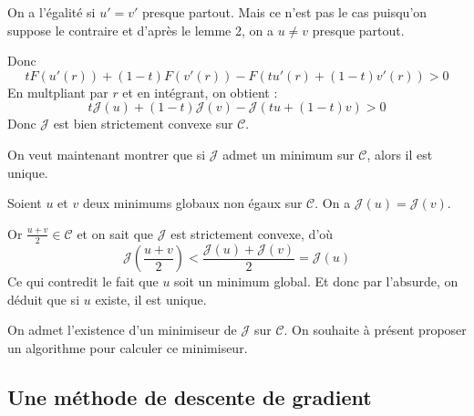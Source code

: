 \documentclass{article}
\newcommand{\SetC}{\mathcal{C}}
\newcommand{\FunctionJ}{\mathcal{J}}
\begin{document}
{    On a l'égalité si $u' = v'$ presque partout. Mais ce n'est pas le cas puisqu'on suppose le contraire et d'après le lemme 2, on a $u \neq v$ presque partout.

    Donc $$t F(u'(r)) + (1-t) F(v'(r)) - F(t u'(r) + (1-t) v'(r)) > 0$$
    En multpliant par $r$ et en intégrant, on obtient :
    $$t \FunctionJ(u) + (1-t) \FunctionJ(v) - \FunctionJ(t u + (1 - t) v) > 0$$
    Donc $\FunctionJ$ est bien strictement convexe sur $\SetC$.\newline

    On veut maintenant montrer que si $\FunctionJ$ admet un minimum sur $\SetC$, alors il est unique.

    Soient $u$ et $v$ deux minimums globaux non égaux sur $\SetC$.
    On a $\mathcal{J}(u) = \mathcal{J}(v)$.

    Or $\frac{u+v}{2}\in \SetC$ et on sait que $\FunctionJ$ est strictement convexe, d'où $$\FunctionJ \left( \frac{u+v}{2} \right) < \frac{\FunctionJ(u)+\FunctionJ(v)}{2} = \FunctionJ(u)$$
    Ce qui contredit le fait que $u$ soit un minimum global. Et donc par l'absurde, on déduit que si $u$ existe, il est unique.\newline

    
}


On admet l’existence d’un minimiseur de $\FunctionJ$ sur $\SetC$. On souhaite à présent proposer un algorithme pour calculer ce minimiseur.


\newpage
\subsection{Une méthode de descente de gradient}
\end{document}
